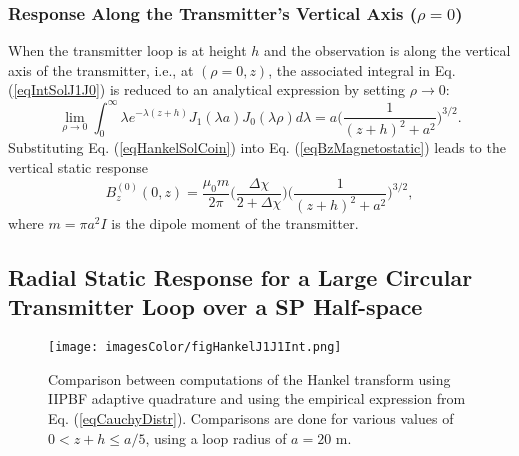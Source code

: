 \documentclass[journal]{IEEEtran}  %
\begin{document}
\subsubsection{Response Along the Transmitter's Vertical Axis ($\rho = 0$)}
When the transmitter loop is at height $h$ and the
observation is along the vertical axis of the transmitter, i.e., at
$(\rho =0, z)$, the associated integral in Eq. (\ref{eqIntSolJ1J0})
is reduced to an analytical expression by setting $\rho \rightarrow
0$:
\begin{equation}
\lim_{\rho \rightarrow 0} \int^{\infty}_0 \!\!\! \lambda e^{-\lambda
(z+h)} J_1(\lambda a) J_0 (\lambda \rho) d \lambda \! = \! a \Bigg (
\! \frac{1}{(z+h)^2 + a^2} \! \Bigg )^{3/2}. \label{eqHankelSolCoin}
\end{equation}
Substituting Eq. (\ref{eqHankelSolCoin}) into Eq.
(\ref{eqBzMagnetostatic}) leads to the vertical static response
\begin{equation}
\label{eqStaticCoinBz}
B_z^{(0)}(0,z) = \frac{\mu_0 m}{2 \pi} \Bigg
( \frac{\Delta \chi}{2 + \Delta \chi} \Bigg ) \Bigg (
\frac{1}{(z+h)^2 + a^2} \Bigg )^{3/2},
\end{equation}
where $m=\pi a^2 I$ is the dipole moment of the transmitter.


\subsection{Radial Static Response for a Large Circular Transmitter Loop over a SP Half-space}
\label{secRadial}

\begin{figure}[!b]
\centering
\texttt{[image: imagesColor/figHankelJ1J1Int.png]}
\vspace{15pt}
\caption{Comparison between computations of the
Hankel transform using IIPBF adaptive quadrature and using the
empirical expression from Eq. (\ref{eqCauchyDistr}). Comparisons are
done for various values of $0 < z+h \leq a/5$, using a loop radius
of $a = 20$ m.} 
\label{figHankelJ1J1Int}
\end{figure}
%
\end{document}
